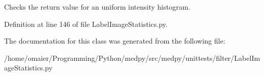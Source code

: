 Checks the return value for an uniform intensity histogram. 



Definition at line 146 of file LabelImageStatistics.py.



The documentation for this class was generated from the following file:\begin{DoxyCompactItemize}
\item 
/home/omaier/Programming/Python/medpy/src/medpy/unittests/filter/LabelImageStatistics.py\end{DoxyCompactItemize}

